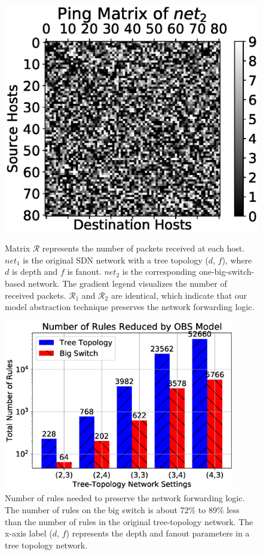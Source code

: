 \begin{figure}[ht]
{            \includegraphics[width=.45\textwidth]{OneBigSwitch/figures/bs_ping_mat_4_3.eps}
                \label{OBS:Fig:PingMatrix4}
            }
        \caption[Forwarding Logic Evaluation after One-Big-Switch Abstraction]{
            Matrix $\mathcal{R}$ represents the number of packets received at each host.
        $net_1$ is the original SDN network with a tree topology ($d$, $f$),
        where $d$ is depth and $f$ is fanout.
        $net_2$ is the corresponding one-big-switch-based network.
        The gradient legend visualizes the number of received packets.
        $\mathcal{R}_1$ and $\mathcal{R}_2$ are identical,
        which indicate that our model abstraction technique preserves the network forwarding logic.}
    \label{OBS:Fig:ComparePingMatrix}
\end{figure}

\begin{figure}[ht]
    \centering
    \includegraphics[width=0.9\textwidth]{OneBigSwitch/figures/comp_num_rules.eps}
    \caption[Number of Rules Reduced after One-Big-Switch Abstraction]{Number of rules needed to preserve the network forwarding logic.
        The number of rules on the big switch is about 72\% to 89\% less than
        the number of rules in the original tree-topology network.
        The x-axis label ($d$, $f$) represents the depth and fanout parameters
        in a tree topology network.}
    \label{OBS:Fig:CompareNumRules}
\end{figure}


